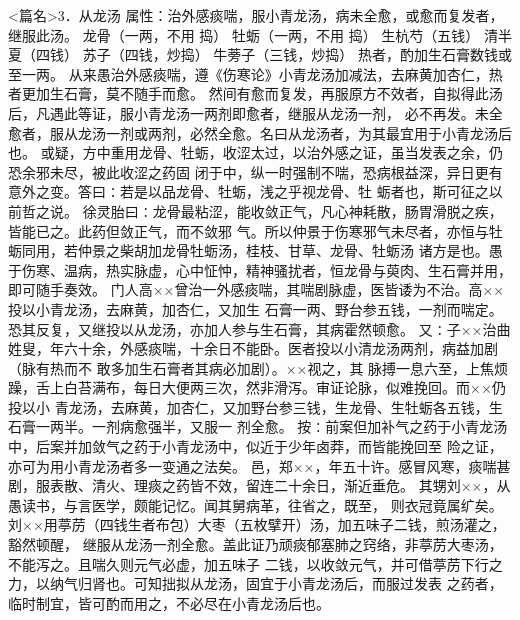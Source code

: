\documentclass[a4paper,12pt,UTF8,twoside]{ctexbook}
\begin{document}
<篇名>3．从龙汤
属性：治外感痰喘，服小青龙汤，病未全愈，或愈而复发者，继服此汤。 
龙骨（一两，不用 捣） 牡蛎（一两，不用 捣） 生杭芍（五钱） 清半夏（四钱） 苏子（四钱，炒捣） 
牛蒡子（三钱，炒捣） 
热者，酌加生石膏数钱或至一两。 
从来愚治外感痰喘，遵《伤寒论》小青龙汤加减法，去麻黄加杏仁，热者更加生石膏，莫不随手而愈。 
然间有愈而复发，再服原方不效者，自拟得此汤后，凡遇此等证，服小青龙汤一两剂即愈者，继服从龙汤一剂， 
必不再发。未全愈者，服从龙汤一剂或两剂，必然全愈。名曰从龙汤者，为其最宜用于小青龙汤后 
也。 
或疑，方中重用龙骨、牡蛎，收涩太过，以治外感之证，虽当发表之余，仍恐余邪未尽，被此收涩之药固 
闭于中，纵一时强制不喘，恐病根益深，异日更有意外之变。答曰∶若是以品龙骨、牡蛎，浅之乎视龙骨、牡 
蛎者也，斯可征之以前哲之说。 
徐灵胎曰∶龙骨最粘涩，能收敛正气，凡心神耗散，肠胃滑脱之疾，皆能已之。此药但敛正气，而不敛邪 
气。所以仲景于伤寒邪气未尽者，亦恒与牡蛎同用，若仲景之柴胡加龙骨牡蛎汤，桂枝、甘草、龙骨、牡蛎汤 
诸方是也。愚于伤寒、温病，热实脉虚，心中怔忡，精神骚扰者，恒龙骨与萸肉、生石膏并用，即可随手奏效。 
门人高××曾治一外感痰喘，其喘剧脉虚，医皆诿为不治。高××投以小青龙汤，去麻黄，加杏仁，又加生 
石膏一两、野台参五钱，一剂而喘定。恐其反复，又继投以从龙汤，亦加人参与生石膏，其病霍然顿愈。 
又∶子××治曲姓叟，年六十余，外感痰喘，十余日不能卧。医者投以小清龙汤两剂，病益加剧（脉有热而不 
敢多加生石膏者其病必加剧）。××视之，其 
脉搏一息六至，上焦烦躁，舌上白苔满布，每日大便两三次，然非滑泻。审证论脉，似难挽回。而××仍投以小 
青龙汤，去麻黄，加杏仁，又加野台参三钱，生龙骨、生牡蛎各五钱，生石膏一两半。一剂病愈强半，又服一 
剂全愈。 
按∶前案但加补气之药于小青龙汤中，后案并加敛气之药于小青龙汤中，似近于少年卤莽，而皆能挽回至 
险之证，亦可为用小青龙汤者多一变通之法矣。 
邑，郑××，年五十许。感冒风寒，痰喘甚剧，服表散、清火、理痰之药皆不效，留连二十余日，渐近垂危。 
其甥刘××，从愚读书，与言医学，颇能记忆。闻其舅病革，往省之，既至， 
则衣冠竟属纩矣。刘××用葶苈（四钱生者布包）大枣（五枚擘开）汤，加五味子二钱，煎汤灌之，豁然顿醒， 
继服从龙汤一剂全愈。盖此证乃顽痰郁塞肺之窍络，非葶苈大枣汤，不能泻之。且喘久则元气必虚，加五味子 
二钱，以收敛元气，并可借葶苈下行之力，以纳气归肾也。可知拙拟从龙汤，固宜于小青龙汤后，而服过发表 
之药者，临时制宜，皆可酌而用之，不必尽在小青龙汤后也。 
\end{document}
